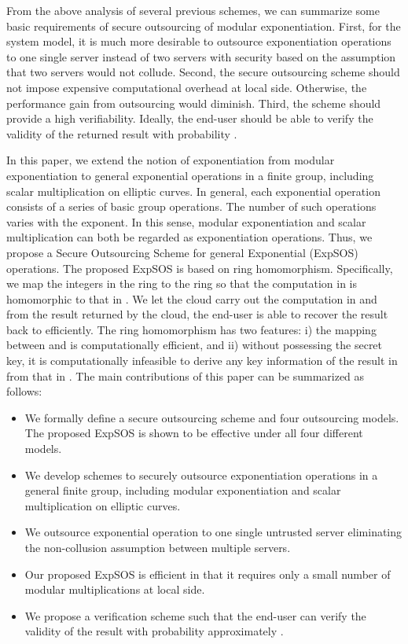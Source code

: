 \documentclass[english,draftcls,onecolumn,11pt]{IEEEtran}
\theoremstyle{definition}
\theoremstyle{plain}
\theoremstyle{plain}
\theoremstyle{definition}
\begin{document}
From the above analysis of several previous schemes, we can summarize
some basic requirements of secure outsourcing of modular exponentiation.
First, for the system model, it is much more desirable to outsource
exponentiation operations to one single server instead of two servers
with security based on the assumption that two servers would not collude.
Second, the secure outsourcing scheme should not impose expensive
computational overhead at local side. Otherwise, the performance gain
from outsourcing would diminish. Third, the scheme should provide
a high verifiability. Ideally, the end-user should be able to verify
the validity of the returned result with probability .

In this paper, we extend the notion of exponentiation from modular
exponentiation to general exponential operations in a finite group,
including scalar multiplication on elliptic curves. In general, each
exponential operation consists of a series of basic group operations.
The number of such operations varies with the exponent. In this sense,
modular exponentiation and scalar multiplication can both be regarded
as exponentiation operations. Thus, we propose a Secure Outsourcing
Scheme for general Exponential (ExpSOS) operations. The proposed ExpSOS
is based on ring homomorphism. Specifically, we map the integers in
the ring  to the ring  so that the
computation in  is homomorphic to that in .
We let the cloud carry out the computation in  and
from the result returned by the cloud, the end-user is able to recover
the result back to  efficiently. The ring homomorphism
has two features: i) the mapping between  and 
is computationally efficient, and ii) without possessing the secret
key, it is computationally infeasible to derive any key information
of the result in  from that in .
The main contributions of this paper can be summarized as follows:
\begin{itemize}
\item We formally define a secure outsourcing scheme and four outsourcing
models. The proposed ExpSOS is shown to be effective under all four
different models.
\item We develop schemes to securely outsource exponentiation operations
in a general finite group, including modular exponentiation and scalar
multiplication on elliptic curves.
\item We outsource exponential operation to one single untrusted server
eliminating the non-collusion assumption between multiple servers.
\item Our proposed ExpSOS is efficient in that it requires only a small
number of modular multiplications at local side. 
\item We propose a verification scheme such that the end-user can verify
the validity of the result with probability approximately .
\end{itemize}
\end{document}
